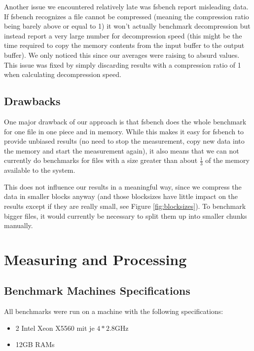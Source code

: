 \documentclass[
	12pt,
	a4paper,
	BCOR10mm,
	DIV14,
	listof=totoc,
	bibliography=totoc,
	headsepline
]{scrreprt}
\begin{document}
Another issue we encountered relatively late was fsbench report misleading data. If fsbench recognizes a file cannot be compressed (meaning the compression ratio being barely above or equal to 1) it won't actually benchmark decompression but instead report a very large number for decompression speed (this might be the time required to copy the memory contents from the input buffer to the output buffer). We only noticed this since our averages were raising to absurd values. This issue was fixed by simply discarding results with a compression ratio of 1 when calculating decompression speed.

\section{Drawbacks}

One major drawback of our approach is that fsbench does the whole benchmark for one file in one piece and in memory. While this makes it easy for fsbench to provide unbiased results (no need to stop the measurement, copy new data into the memory and start the measurement again), it also means that we can not currently do benchmarks for files with a size greater than about \(\frac{1}{3}\) of the memory available to the system.

This does not influence our results in a meaningful way, since we compress the data in smaller blocks anyway (and those blocksizes have little impact on the results except if they are really small, see Figure \ref{fig:blocksizes}). To benchmark bigger files, it would currently be necessary to split them up into smaller chunks manually.

\chapter{Measuring and Processing}
\label{Measuring and Processing}

\section{Benchmark Machines Specifications}
All benchmarks were run on a machine with the following specifications:

\begin{itemize}
\item 2 Intel Xeon X5560 mit je \(4 * 2.8\text{GHz}\)
\item 12GB RAMs
\end{itemize}
\end{document}
